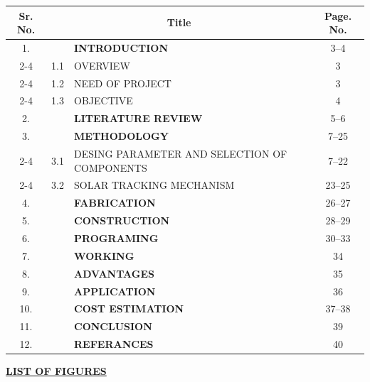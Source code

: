 \documentclass[12pt,a4paper]{article}
\begin{document}
\begin{center}
\renewcommand{\arraystretch}{1.35}
\begin{tabular}{|c|c|l|c|}
\hline
\rowcolor{gray!20}
\textbf{Sr. No.} & \multicolumn{2}{c|}{\textbf{Title}} & \textbf{Page. No.} \\
\hline
1. & & \textbf{INTRODUCTION} & 3--4 \\
\cline{2-4}
   & 1.1 & OVERVIEW & 3 \\
\cline{2-4}
   & 1.2 & NEED OF PROJECT & 3 \\
\cline{2-4}
   & 1.3 & OBJECTIVE & 4 \\
\hline
2. & & \textbf{LITERATURE REVIEW} & 5--6 \\
\hline
3. & & \textbf{METHODOLOGY} & 7--25 \\
\cline{2-4}
   & 3.1 & DESING PARAMETER AND SELECTION OF COMPONENTS & 7--22 \\
\cline{2-4}
   & 3.2 & SOLAR TRACKING MECHANISM & 23--25 \\
\hline
4. & & \textbf{FABRICATION} & 26--27 \\
\hline
5. & & \textbf{CONSTRUCTION} & 28--29 \\
\hline
6. & & \textbf{PROGRAMING} & 30--33 \\
\hline
7. & & \textbf{WORKING} & 34 \\
\hline
8. & & \textbf{ADVANTAGES} & 35 \\
\hline
9. & & \textbf{APPLICATION} & 36 \\
\hline
10. & & \textbf{COST ESTIMATION} & 37--38 \\
\hline
11. & & \textbf{CONCLUSION} & 39 \\
\hline
12. & & \textbf{REFERANCES} & 40 \\
\hline
\end{tabular}
\end{center}
\clearpage




\vspace*{-2mm}
\begin{center}
  {\fontsize{16}{20}\selectfont \bfseries \textcolor{red!80!black}{\underline{LIST OF FIGURES}}}\\[6mm]
\end{center}
\end{document}
